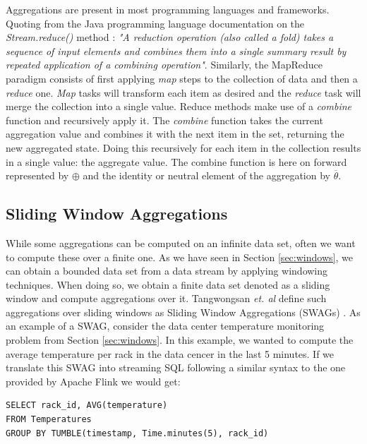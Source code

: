 Aggregations are present in most programming languages and frameworks. Quoting from the Java programming language documentation on the \textit{Stream.reduce()} method \cite{Java13StreamReduce}: 
\textit{"A reduction operation (also called a fold) takes a sequence of input elements and combines them into a single summary result by repeated application of a combining operation"}. Similarly, the MapReduce \cite{MapReduce} paradigm consists of first applying \textit{map} steps to the collection of data and then a \textit{reduce} one. \textit{Map} tasks will transform each item as desired and the \textit{reduce} task will merge the collection into a single value. Reduce methods make use of a \textit{combine} function and recursively apply it. The \textit{combine} function takes the current aggregation value and combines it with the next item in the set, returning the new aggregated state. Doing this recursively for each item in the collection results in a single value: the aggregate value. The combine function is here on forward represented by $\oplus$ and the identity or neutral element of the aggregation by $\overline{\theta}$.

\subsection{Sliding Window Aggregations}

While some aggregations can be computed on an infinite data set, often we want to compute these over a finite one. As we have seen in Section \ref{sec:windows}, we can obtain a bounded data set from a data stream by applying windowing techniques. When doing so, we obtain a finite data set denoted as a sliding window and compute aggregations over it. Tangwongsan \emph{et. al} define such aggregations over sliding windows as Sliding Window Aggregations (SWAGs) \cite{Tangwongsan-Sliding-Window-Aggregation-Algorithms}. As an example of a SWAG, consider the data center temperature monitoring problem from Section \ref{sec:windows}. In this example, we wanted to compute the average temperature per rack in the data cencer in the last 5 minutes. If we translate this SWAG into streaming SQL following a similar syntax to the one provided by Apache Flink \cite{ApacheFlink} we would get:

\begin{verbatim}
SELECT rack_id, AVG(temperature)
FROM Temperatures
GROUP BY TUMBLE(timestamp, Time.minutes(5), rack_id)
\end{verbatim}

